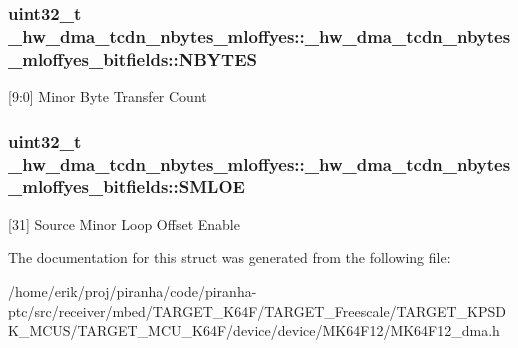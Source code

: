 \subsubsection[{\texorpdfstring{N\+B\+Y\+T\+ES}{NBYTES}}]{\setlength{\rightskip}{0pt plus 5cm}uint32\+\_\+t \+\_\+hw\+\_\+dma\+\_\+tcdn\+\_\+nbytes\+\_\+mloffyes\+::\+\_\+hw\+\_\+dma\+\_\+tcdn\+\_\+nbytes\+\_\+mloffyes\+\_\+bitfields\+::\+N\+B\+Y\+T\+ES}\hypertarget{struct__hw__dma__tcdn__nbytes__mloffyes_1_1__hw__dma__tcdn__nbytes__mloffyes__bitfields_ae4a82e0fa61ff34351c777f7101eef08}{}\label{struct__hw__dma__tcdn__nbytes__mloffyes_1_1__hw__dma__tcdn__nbytes__mloffyes__bitfields_ae4a82e0fa61ff34351c777f7101eef08}
\mbox{[}9\+:0\mbox{]} Minor Byte Transfer Count 
\subsubsection[{\texorpdfstring{S\+M\+L\+OE}{SMLOE}}]{\setlength{\rightskip}{0pt plus 5cm}uint32\+\_\+t \+\_\+hw\+\_\+dma\+\_\+tcdn\+\_\+nbytes\+\_\+mloffyes\+::\+\_\+hw\+\_\+dma\+\_\+tcdn\+\_\+nbytes\+\_\+mloffyes\+\_\+bitfields\+::\+S\+M\+L\+OE}\hypertarget{struct__hw__dma__tcdn__nbytes__mloffyes_1_1__hw__dma__tcdn__nbytes__mloffyes__bitfields_ac67156243ac9546bb43fe3a1bc6ac492}{}\label{struct__hw__dma__tcdn__nbytes__mloffyes_1_1__hw__dma__tcdn__nbytes__mloffyes__bitfields_ac67156243ac9546bb43fe3a1bc6ac492}
\mbox{[}31\mbox{]} Source Minor Loop Offset Enable 

The documentation for this struct was generated from the following file\+:\begin{DoxyCompactItemize}
\item 
/home/erik/proj/piranha/code/piranha-\/ptc/src/receiver/mbed/\+T\+A\+R\+G\+E\+T\+\_\+\+K64\+F/\+T\+A\+R\+G\+E\+T\+\_\+\+Freescale/\+T\+A\+R\+G\+E\+T\+\_\+\+K\+P\+S\+D\+K\+\_\+\+M\+C\+U\+S/\+T\+A\+R\+G\+E\+T\+\_\+\+M\+C\+U\+\_\+\+K64\+F/device/device/\+M\+K64\+F12/M\+K64\+F12\+\_\+dma.\+h\end{DoxyCompactItemize}
